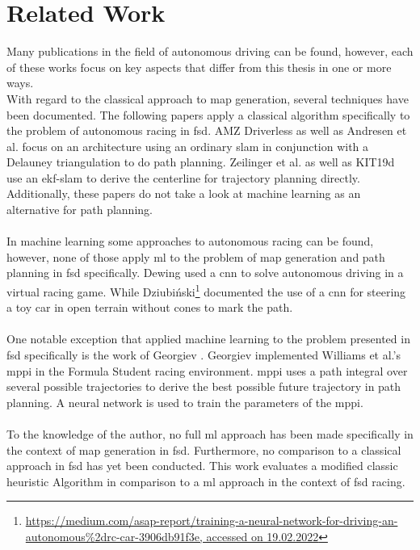 \section{Related Work}
Many publications in the field of autonomous driving can be found, however, each of these works focus on key aspects that differ from this thesis in one or more ways. \\
With regard to the classical approach to map generation, several techniques have been documented. The following papers apply a classical algorithm specifically to the problem of autonomous racing in \ac{fsd}. AMZ Driverless \cite{kabzan2019amz} as well as Andresen et al. \cite{andresen2020} focus on an architecture using an ordinary \ac{slam} in conjunction with a Delauney triangulation to do path planning. Zeilinger et al. \cite{zeilinger2017} as well as KIT19d \cite{nekkah2020} use an \ac{ekf}-\ac{slam} to derive the centerline for trajectory planning directly. Additionally, these papers do not take a look at machine learning as an alternative for path planning.\\
\\
In machine learning some approaches to autonomous racing can be found, however, none of those apply \ac{ml} to the problem of map generation and path planning in \ac{fsd} specifically. Dewing \cite{DewingNowTI}
used a \ac{cnn} to solve autonomous driving in a virtual racing game. While Dziubiński\footnote{\url{https://medium.com/asap-report/training-a-neural-network-for-driving-an-autonomous\%2drc-car-3906db91f3e, accessed on 19.02.2022}} documented the use of a \ac{cnn} for steering a toy car in open terrain without cones to mark the path.\\
\\
One notable exception that applied machine learning to the problem presented in \ac{fsd} specifically is the work of Georgiev \cite{georgiev2019}. Georgiev implemented Williams et al.'s \cite{williams2016} \ac{mppi} in the Formula Student racing environment. \ac{mppi} uses a path integral over several possible trajectories to derive the best possible future trajectory in path planning. A neural network is used to train the parameters of the \ac{mppi}.\\
\\
To the knowledge of the author, no full \ac{ml} approach has been made specifically in the context of map generation in \ac{fsd}. Furthermore, no comparison to a classical approach in \ac{fsd} has yet been conducted. This work evaluates a modified classic heuristic Algorithm in comparison to a \ac{ml} approach in the context of \ac{fsd} racing.

